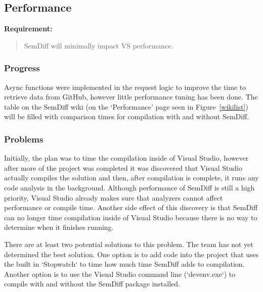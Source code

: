 \documentclass[draftclsnofoot,onecolumn]{IEEEtran}
\begin{document}
\subsection{Performance}%

\textbf{Requirement:}

\begin{quote}

SemDiff will minimally impact VS performance.

\end{quote}

\subsubsection{Progress}

Async functions were implemented in the request logic to improve the time to 
retrieve data from GitHub, however little performance tuning has been done. 
The table on the SemDiff wiki (on the ‘Performance’ page seen in 
Figure~\ref{wikilist}) will be filled with comparison times for compilation 
with and without SemDiff. 

\subsubsection{Problems}

Initially, the plan was to time the compilation inside of Visual Studio, 
however after more of the project was completed it was discovered that Visual 
Studio actually compiles the solution and then, after compilation is 
complete, it runs any code analysis in the background. Although performance 
of SemDiff is still a high priority, Visual Studio already makes sure that 
analyzers cannot affect performance or compile time. Another side effect of 
this discovery is that SemDiff can no longer time compilation inside of 
Visual Studio because there is no way to determine when it finishes running.
 
There are at least two potential solutions to this problem. The team has not 
yet determined the best solution. One option is to add code into the project 
that uses the built in `Stopwatch` to time how much time SemDiff adds to 
compilation. Another option is to use the Visual Studio command line 
(`devenv.exe`) to compile with and without the SemDiff package installed.
\end{document}
